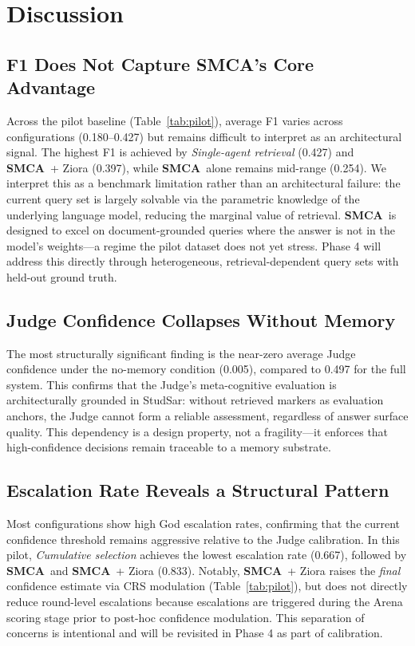\documentclass[11pt, a4paper]{article}
\newcommand{\sysname}{\textbf{SMCA}}
\begin{document}
\section{Discussion}
\label{sec:discussion}
 
\subsection{F1 Does Not Capture SMCA's Core Advantage}
Across the pilot baseline (Table~\ref{tab:pilot}), average F1 varies across configurations (0.180--0.427) but remains difficult to interpret as an architectural signal. The highest F1 is achieved by \textit{Single-agent retrieval} (0.427) and \sysname\ + Ziora (0.397), while \sysname\ alone remains mid-range (0.254). We interpret this as a benchmark limitation rather than an architectural failure: the current query set is largely solvable via the parametric knowledge of the underlying language model, reducing the marginal value of retrieval. \sysname\ is designed to excel on document-grounded queries where the answer is not in the model's weights---a regime the pilot dataset does not yet stress. Phase 4 will address this directly through heterogeneous, retrieval-dependent query sets with held-out ground truth.
 
\subsection{Judge Confidence Collapses Without Memory}
The most structurally significant finding is the near-zero average Judge confidence under the no-memory condition (0.005), compared to 0.497 for the full system. This confirms that the Judge's meta-cognitive evaluation is architecturally grounded in StudSar: without retrieved markers as evaluation anchors, the Judge cannot form a reliable assessment, regardless of answer surface quality. This dependency is a design property, not a fragility---it enforces that high-confidence decisions remain traceable to a memory substrate.
 
\subsection{Escalation Rate Reveals a Structural Pattern}
Most configurations show high God escalation rates, confirming that the current confidence threshold remains aggressive relative to the Judge calibration. In this pilot, \textit{Cumulative selection} achieves the lowest escalation rate (0.667), followed by \sysname\ and \sysname\ + Ziora (0.833). Notably, \sysname\ + Ziora raises the \emph{final} confidence estimate via CRS modulation (Table~\ref{tab:pilot}), but does not directly reduce round-level escalations because escalations are triggered during the Arena scoring stage prior to post-hoc confidence modulation. This separation of concerns is intentional and will be revisited in Phase 4 as part of calibration.
 
\end{document}
